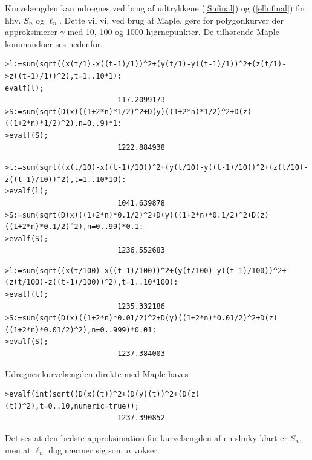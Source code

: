 Kurvelængden kan udregnes ved brug af udtrykkene (\ref{Snfinal}) og (\ref{ellnfinal}) for hhv. \(S_n\) og \(\ell_n\). Dette vil vi, ved brug af Maple, gøre for polygonkurver der approksimerer \(\gamma\) med 10, 100 og 1000 hjørnepunkter. De tilhørende Maple-kommandoer ses nedenfor.
\begin{lstlisting}[caption=længden af \(\gamma(t)\) approksimeret med 10 punkter] 
>l:=sum(sqrt((x(t/1)-x((t-1)/1))^2+(y(t/1)-y((t-1)/1))^2+(z(t/1)->z((t-1)/1))^2),t=1..10*1):
evalf(l);
                          117.2099173
>S:=sum(sqrt(D(x)((1+2*n)*1/2)^2+D(y)((1+2*n)*1/2)^2+D(z)((1+2*n)*1/2)^2),n=0..9)*1:
>evalf(S);
                          1222.884938

\end{lstlisting}
\begin{lstlisting}[caption=længden af \(\gamma(t)\) approksimeret med 100 punkter]
>l:=sum(sqrt((x(t/10)-x((t-1)/10))^2+(y(t/10)-y((t-1)/10))^2+(z(t/10)-z((t-1)/10))^2),t=1..10*10):
>evalf(l);
                          1041.639878
>S:=sum(sqrt(D(x)((1+2*n)*0.1/2)^2+D(y)((1+2*n)*0.1/2)^2+D(z)((1+2*n)*0.1/2)^2),n=0..99)*0.1:
>evalf(S);
                          1236.552683

\end{lstlisting}
\begin{lstlisting}[caption=længden af \(\gamma(t)\) approksimeret med 1000 punkter]
>l:=sum(sqrt((x(t/100)-x((t-1)/100))^2+(y(t/100)-y((t-1)/100))^2+(z(t/100)-z((t-1)/100))^2),t=1..10*100):
>evalf(l);
                          1235.332186
>S:=sum(sqrt(D(x)((1+2*n)*0.01/2)^2+D(y)((1+2*n)*0.01/2)^2+D(z)((1+2*n)*0.01/2)^2),n=0..999)*0.01:
>evalf(S);
                          1237.384003

\end{lstlisting}
Udregnes kurvelængden direkte med Maple haves
\begin{lstlisting}[caption=Numerisk evaluering af kurvelængden ved brug af Maples int kommando]
>evalf(int(sqrt((D(x)(t))^2+(D(y)(t))^2+(D(z)(t))^2),t=0..10,numeric=true));
                          1237.390852

\end{lstlisting} 
Det ses at den bedste approksimation for kurvelængden af en slinky klart er \(S_n\), men at \(\ell_n\) dog nærmer sig som \(n\) vokser.  \\
